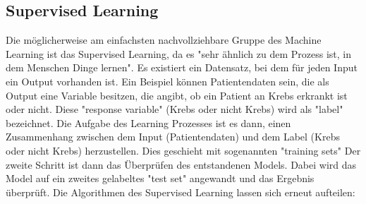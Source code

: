 \subsection{Supervised Learning}\label{subsec:sl}
Die möglicherweise am einfachsten nachvollziehbare Gruppe des Machine Learning ist das Supervised Learning, da es "sehr ähnlich zu dem Prozess ist, in dem Menschen Dinge lernen"\citep[S.~13; eigene Übersetzung]{kim_matlab_2017}. Es existiert ein Datensatz, bei dem für jeden Input ein Output vorhanden ist. Ein Beispiel können Patientendaten sein, die als Output eine Variable besitzen, die angibt, ob ein Patient an Krebs erkrankt ist oder nicht.\citep[S.~222]{ramasubramanian_machine_2017} Diese "response variable" (Krebs oder nicht Krebs) wird als "label"\citep[S.~222]{ramasubramanian_machine_2017} bezeichnet. Die Aufgabe des Learning Prozesses ist es dann, einen Zusammenhang zwischen dem Input (Patientendaten) und dem Label (Krebs oder nicht Krebs) herzustellen. Dies geschieht mit sogenannten "training sets"\citep[S.~5]{paluszek_matlab_2017} Der zweite Schritt ist dann das Überprüfen des entstandenen Models. Dabei wird das Model auf ein zweites gelabeltes "test set"\citep[S.~5]{paluszek_matlab_2017} angewandt und das Ergebnis überprüft.\newline
Die Algorithmen des Supervised Learning lassen sich erneut aufteilen:

